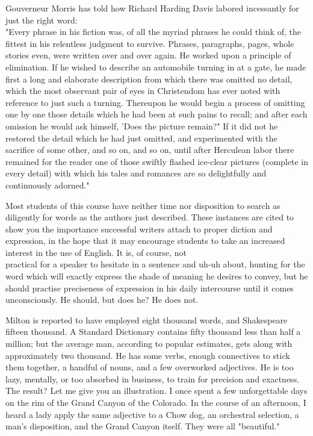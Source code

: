 \documentclass[10pt]{article}
\begin{document}
Gouverneur Morris has told how Richard Harding Davis labored incessantly for just the right word:\\
"Every phrase in his fiction was, of all the myriad phrases he could think of, the fittest in his relentless judgment to survive. Phrases, paragraphs, pages, whole stories even, were written over and over again. He worked upon a principle of elimination. If he wished to describe an automobile turning in at a gate, he made first a long and elaborate description from which there was omitted no detail, which the most observant pair of eyes in Christendom has ever noted with reference to just such a turning. Thereupon he would begin a process of omitting one by one those details which he had been at such pains to recall; and after each omission he would ask himself, 'Does the picture remain?" If it did not he restored the detail which he had just omitted, and experimented with the sacrifice of some other, and so on, and so on, until after Herculean labor there remained for the reader one of those swiftly flashed ice-clear pictures (complete in every detail) with which his tales and romances are so delightfully and continuously adorned."

Most students of this course have neither time nor disposition to search as diligently for words as the authors just described. These instances are cited to show you the importance successful writers attach to proper diction and expression, in the hope that it may encourage students to take an increased interest in the use of English. It is, of course, not\\
practical for a speaker to hesitate in a sentence and uh-uh about, hunting for the word which will exactly express the shade of meaning he desires to convey, but he should practise preciseness of expression in his daily intercourse until it comes unconsciously. He should, but does he? He does not.

Milton is reported to have employed eight thousand words, and Shakespeare fifteen thousand. A Standard Dictionary contains fifty thousand less than half a million; but the average man, according to popular estimates, gets along with approximately two thousand. He has some verbs, enough connectives to stick them together, a handful of nouns, and a few overworked adjectives. He is too lazy, mentally, or too absorbed in business, to train for precision and exactness. The result? Let me give you an illustration. I once spent a few unforgettable days on the rim of the Grand Canyon of the Colorado. In the course of an afternoon, I heard a lady apply the same adjective to a Chow dog, an orchestral selection, a man's disposition, and the Grand Canyon itself. They were all "beautiful."
\end{document}
